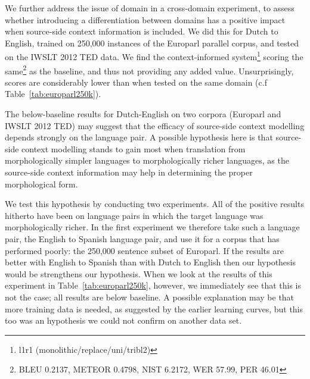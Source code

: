 \documentclass[smallextended]{svjour3}       %
\theoremstyle{break}
\begin{document}
We further address the issue of domain in a cross-domain experiment, to assess
whether introducing a differentiation between domains has a positive impact
when source-side context information is included. We did this for Dutch to
English, trained on 250,000 instances of the Europarl parallel corpus, and
tested on the IWSLT 2012 TED data. We find the context-informed
system\footnote{l1r1 (monolithic/replace/uni/tribl2)} scoring the
same\footnote{BLEU 0.2137, METEOR 0.4798, NIST 6.2172, WER 57.99, PER 46.01} as
the baseline, and thus not providing any added value. Unsurprisingly, scores
are considerably lower than when tested on the same domain (c.f
Table~\ref{tab:europarl250k}).

The below-baseline results for Dutch-English on two corpora (Europarl and IWSLT
2012 TED) may suggest that the efficacy of source-side context modelling
depends strongly on the language pair. A possible hypothesis here is that
source-side context modelling stands to gain most when translation from
morphologically simpler languages to morphologically richer languages, as the
source-side context information may help in determining the proper
morphological form. 

We test this hypothesis by conducting two experiments. All of the positive
results hitherto have been on language pairs in which the target language was
morphologically richer.  In the first experiment we therefore take such a
language pair, the English to Spanish language pair, and use it for a corpus
that has performed poorly: the 250,000 sentence subset of Europarl.  If the
results are better with English to Spanish than with Dutch to English then our
hypothesis would be strengthens our hypothesis. When we look at the results of
this experiment in Table~\ref{tab:europarl250k}, however, we immediately see
that this is not the case; all results are below baseline. A possible
explanation may be that more training data is needed, as suggested by the
earlier learning curves, but this too was an hypothesis we could not confirm on
another data set.
\end{document}
